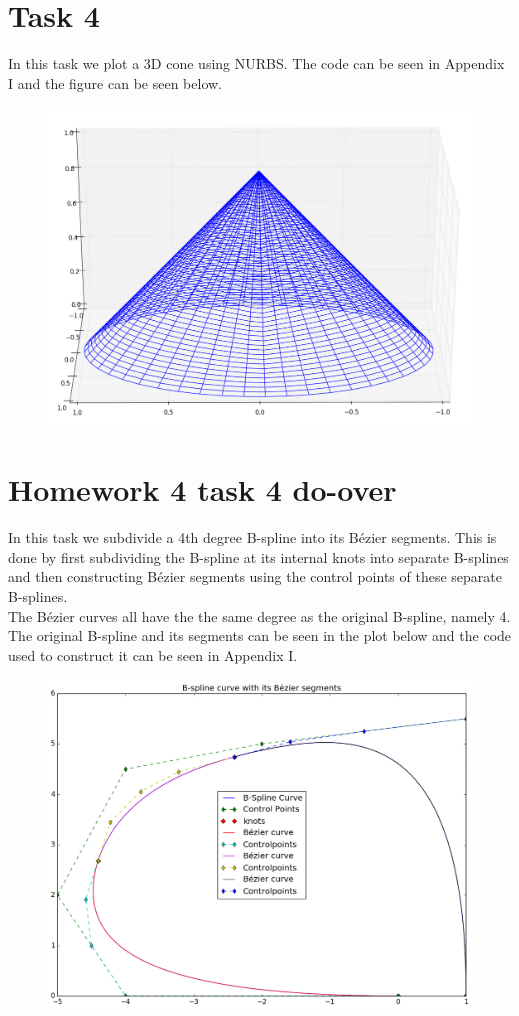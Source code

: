 \documentclass[]{article}
\begin{document}
\section*{Task 4}
In this task we plot a 3D cone using NURBS. The code can be seen in Appendix I and the figure can be seen below.\\

\begin{figure}[h!]
	\includegraphics[scale=0.3]{nurbscone}
\end{figure}
\newpage
\section*{Homework 4 task 4 do-over}
In this task we subdivide a 4th degree B-spline into its B\'{e}zier segments. This is done by first subdividing the B-spline at its internal knots into separate B-splines and then constructing B\'{e}zier segments using the control points of these separate B-splines.\\
The B\'{e}zier curves all have the the same degree as the original B-spline, namely 4. The original B-spline and its segments can be seen in the plot below and the code used to construct it can be seen in Appendix I.
\begin{figure}[h!]
	\includegraphics[scale=0.4]{task4_doover}
\end{figure}
\end{document}
